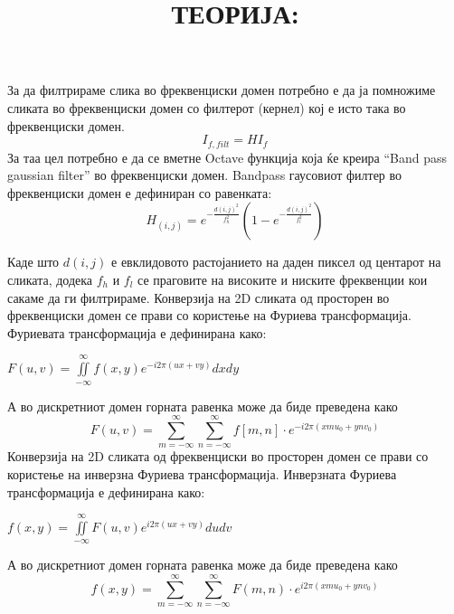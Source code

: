 \documentclass[12pt]{article}
\begin{document}
\title{ТЕОРИЈА:}
За да филтрираме слика во фреквенциски домен потребно е да ја помножиме
сликата во фреквенциски домен со филтерот (кернел) кој е исто така во
фреквенциски домен.
\begin{equation}
I_{f,filt}=HI_f
\end{equation}
За таа цел потребно е да се вметне Octave функција која ќе креира “Band pass
gaussian filter” во фреквенциски домен. Bandpass гаусовиот филтер во
фреквенциски домен е дефиниран со равенката:
\begin{equation}
H_{(i,j)}=e^{-\frac{d(i,j)^2}{f_h^2}}(1-e^{-\frac{d(i,j)^2}{f_l^2}})
\end{equation}

Каде што $d(i,j)$ е евклидовото растојанието на даден пиксел од центарот на
сликата, додека $f_h$ и $f_l$ се праговите на високите и ниските фреквенции кои сакаме
да ги филтрираме.
Конверзија на 2D сликата од просторен во фреквенциски домен се прави со
користење на Фуриева трансформација. Фуриевата трансформација е дефинирана
како:

         $F(u,v)=\iint \limits_{-\infty}^{\infty} f(x,y)e^{-i2\pi(ux+vy)}dxdy$


А во дискретниот домен горната равенка може да биде преведена како
\begin{equation}
F(u,v)=\sum_{m=-\infty}^{\infty}\sum_{n=-\infty}^{\infty}f[m,n]\cdot e^{-i2\pi(xmu_0+ynv_0)}
\end{equation}
Конверзија на 2D сликата од фреквенциски во просторен домен се прави со
користење на инверзна Фуриева трансформација. Инверзната Фуриева
трансформација е дефинирана како:

$f(x,y)=\iint \limits_{-\infty}^{\infty}F(u,v)e^{i2\pi(ux+vy)}dudv$

А во дискретниот домен горната равенка може да биде преведена како
\begin{equation}
f(x,y)=\sum_{m=-\infty}^{\infty}\sum_{n=-\infty}^{\infty}F(m,n)\cdot e^{i2\pi(xmu_0+ynv_0)}
\end{equation}
\end{document}
